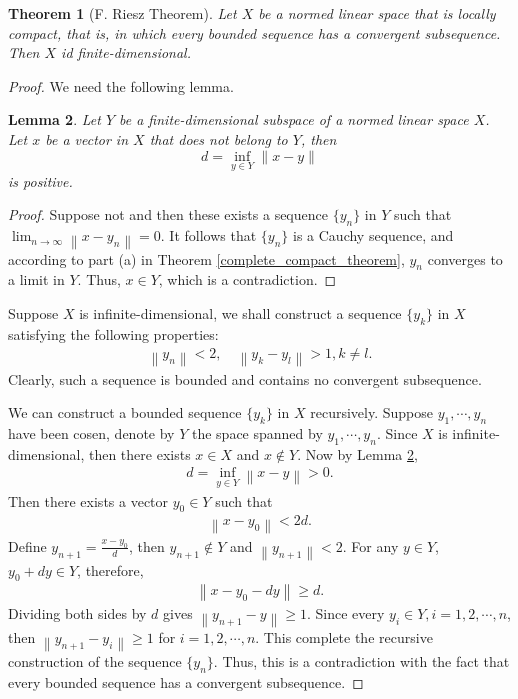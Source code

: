 \documentclass[11pt]{book}
\newtheorem{theorem}{Theorem}[chapter]
\newtheorem{lemma}[theorem]{Lemma}
\theoremstyle{definition}
\numberwithin{equation}{chapter}
\begin{document}
\begin{theorem}[F. Riesz Theorem]\label{riesz_theorem_finite_dim}
Let $X$ be a normed linear space that is locally compact, that is, in which every bounded sequence has a convergent subsequence. Then $X$ id finite-dimensional.
\end{theorem}
\begin{proof}
We need the following lemma.

\begin{lemma}\label{finite_dimensional_distance_lemma}
Let $Y$ be a finite-dimensional subspace of a normed linear space $X$. Let $x$ be a vector in $X$ that does not belong to $Y$, then 
$$d = \inf_{y\in Y} \|x - y\| $$
is positive. 
\end{lemma}
\begin{proof}
Suppose not and then these exists a sequence $\{y_n\}$ in $Y$ such that $\lim_{n\to\infty} \left\|x - y_n\right\| = 0$. It follows that $\{y_n\}$ is a Cauchy sequence, and according to part (a) in Theorem \ref{complete_compact_theorem}, $y_n$ converges to a limit in $Y$. Thus, $x \in Y$, which is a contradiction.
\end{proof}

Suppose $X$ is infinite-dimensional, we shall construct a sequence $\{y_k\}$ in $X$ satisfying the following properties:
\begin{align*}
    \left\|y_n\right\| < 2, \quad \left\|y_k - y_l\right\| > 1, k \neq l.
\end{align*}
Clearly, such a sequence is bounded and contains no convergent subsequence.

We can construct a bounded sequence $\{y_k\}$ in $X$ recursively. Suppose $y_1, \cdots, y_n$ have been cosen, denote by $Y$ the space spanned by $y_1, \cdots, y_n$. Since $X$ is infinite-dimensional, then there exists $x \in X$ and $x \notin Y$. Now by Lemma \ref{finite_dimensional_distance_lemma}, 
\begin{align*}
    d = \inf_{y \in Y} \left\|x - y\right\| > 0.
\end{align*}
Then there exists a vector $y_0 \in Y$ such that
\begin{align*}
    \left\|x - y_0\right\| < 2d.
\end{align*}
Define $y_{n+1} = \frac{x - y_0}{d}$, then $y_{n+1} \notin Y$ and $\left\|y_{n+1}\right\| < 2$. For any $y \in Y$, $y_0 + dy \in Y$, therefore, 
\begin{align*}
    \left\|x - y_0 - dy\right\| \geq d.
\end{align*}
Dividing both sides by $d$ gives $\left\|y_{n+1} - y\right\| \geq 1$. Since every $y_i \in Y, i = 1, 2, \cdots, n$, then $\left\|y_{n+1} - y_i\right\| \geq 1$ for $i = 1, 2, \cdots, n$. This complete the recursive construction of the sequence $\{y_n\}$. Thus, this is a contradiction with the fact that every bounded sequence has a convergent subsequence.
\end{proof}
\end{document}
